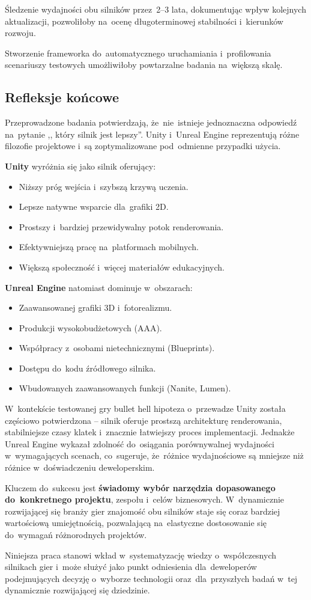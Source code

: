 Śledzenie wydajności obu silników przez~2--3 lata, dokumentując wpływ kolejnych aktualizacji, pozwoliłoby na~ocenę długoterminowej stabilności i~kierunków rozwoju.

Stworzenie frameworka do~automatycznego uruchamiania i~profilowania scenariuszy testowych 
umożliwiłoby powtarzalne badania na~większą skalę.

\subsection{Refleksje końcowe}

Przeprowadzone badania potwierdzają, że~nie~istnieje jednoznaczna odpowiedź na~pytanie ,,
który silnik jest lepszy''. Unity i~Unreal Engine reprezentują różne filozofie projektowe 
i~są zoptymalizowane pod~odmienne przypadki użycia.

\textbf{Unity} wyróżnia się jako silnik oferujący:
\begin{itemize}
    \item Niższy próg wejścia i~szybszą krzywą uczenia.
    \item Lepsze natywne wsparcie dla~grafiki 2D.
    \item Prostszy i~bardziej przewidywalny potok renderowania.
    \item Efektywniejszą pracę na~platformach mobilnych.
    \item Większą społeczność i~więcej materiałów edukacyjnych.
\end{itemize}

\textbf{Unreal Engine} natomiast dominuje w~obszarach:
\begin{itemize}
    \item Zaawansowanej grafiki 3D i~fotorealizmu.
    \item Produkcji wysokobudżetowych (AAA).
    \item Współpracy z~osobami nietechnicznymi (Blueprints).
    \item Dostępu do~kodu źródłowego silnika.
    \item Wbudowanych zaawansowanych funkcji (Nanite, Lumen).
\end{itemize}
\newpage
W~kontekście testowanej gry bullet hell hipoteza o~przewadze Unity została częściowo potwierdzona -- 
silnik oferuje prostszą architekturę renderowania, stabilniejsze czasy klatek i~znacznie 
łatwiejszy proces implementacji. Jednakże Unreal Engine wykazał zdolność do~osiągania porównywalnej 
wydajności w~wymagających scenach, co~sugeruje, że~różnice wydajnościowe są mniejsze niż różnice 
w~doświadczeniu deweloperskim.

Kluczem do~sukcesu jest \textbf{świadomy wybór narzędzia dopasowanego do~konkretnego projektu}, zespołu i~celów biznesowych. W~dynamicznie rozwijającej się branży gier znajomość obu silników staje się coraz bardziej wartościową umiejętnością, pozwalającą na~elastyczne dostosowanie się do~wymagań różnorodnych projektów.

Niniejsza praca stanowi wkład w~systematyzację wiedzy o~współczesnych silnikach gier i~może służyć jako punkt odniesienia dla~deweloperów podejmujących decyzję o~wyborze technologii oraz~dla~przyszłych badań w~tej dynamicznie rozwijającej się dziedzinie.
